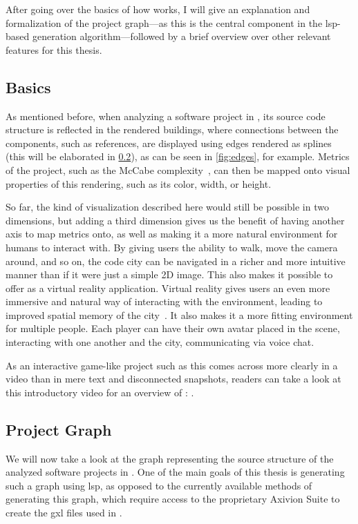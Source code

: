 \documentclass[../thesis]{subfiles}
\begin{document}
After going over the basics of how \SEE{} works, I will give an explanation and formalization of the project graph---as this is the central component in the \gls{lsp}-based  generation algorithm---followed by a brief overview over other relevant features for this thesis.

\subsection{Basics}
As mentioned before, when analyzing a software project in \SEE{}, its source code structure is reflected in the rendered buildings, where connections between the components, such as references, are displayed using edges rendered as splines (this will be elaborated in \cref{subsec:graph}), as can be seen in \cref{fig:edges}, for example.
Metrics of the project, such as the McCabe complexity~\cite{mccabe}, can then be mapped onto visual properties of this rendering, such as its color, width, or height.

So far, the kind of visualization described here would still be possible in two dimensions, but adding a third dimension gives us the benefit of having another axis to map metrics onto, as well as making it a more natural environment for humans to interact with.
By giving users the ability to walk, move the camera around, and so on, the code city can be navigated in a richer and more intuitive manner than if it were just a simple 2D image.
This also makes it possible to offer \SEE{} as a virtual reality application.
Virtual reality gives users an even more immersive and natural way of interacting with the environment, leading to improved spatial memory of the city~\cite[\eg,][]{tavanti2001}.
It also makes it a more fitting environment for multiple people.
Each player can have their own avatar placed in the scene, interacting with one another and the city, communicating via voice chat.

As an interactive game-like project such as this comes across more clearly in a video than in mere text and disconnected snapshots, readers can take a look at this introductory video for an overview of \SEE{}: .

\subsection{Project Graph}\label{subsec:graph}

We will now take a look at the graph representing the source structure of the analyzed software projects in \SEE{}.
One of the main goals of this thesis is generating such a graph using \gls{lsp}, as opposed to the currently available methods of generating this graph, which require access to the proprietary Axivion Suite to create the \gls{gxl} files used in \SEE{}.
\end{document}
